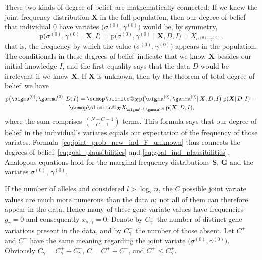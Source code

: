 \documentclass[\ifafour a4paper,12pt,\else a5paper,10pt,\fi%
onecolumn,oneside,article,%
british%
]{memoir}
\makeatletter
\theoremstyle{remark}
\theoremstyle{innote}
\def\sum{\DOTSI\sumop\slimits@}
\renewcommand{\le}{\leqslant}%
\newcommand*{\pf}{\mathrm{p}}%
\renewcommand*{\|}{\mathpunct{|}}
\newcommand*{\dob}{degree of belief}
\newcommand*{\dobs}{degrees of belief}
\newcommand*{\yD}{D}
\newcommand*{\yI}{I}
\newcommand*{\ys}{\sigma}
\newcommand*{\yg}{\gamma}
\newcommand*{\gn}{l}
\newcommand*{\ysi}[1]{\ys^{(#1)}}
\newcommand*{\ygi}[1]{\yg^{(#1)}}
\newcommand*{\yso}{\ysi{0}}
\newcommand*{\ygo}{\ygi{0}}
\newcommand*{\yFs}{\bm{S}}
\newcommand*{\yFg}{\bm{G}}
\newcommand*{\yF}{\bm{X}}
\newcommand*{\yCg}{C_{\gamma}}
\newcommand*{\yCgd}{\yCg^{+}}
\newcommand*{\yCgn}{\yCg^{-}}
\newcommand*{\yCd}{C^{+}}
\newcommand*{\yCn}{C^{-}}
\makeatother
\begin{document}
These two kinds of \dob\ are mathematically connected: If we knew the joint
frequency distribution $\yF$ in the full population, then our degree of
belief that individual $0$ have variates $\bigl( \yso,\ygo \bigr)$ would
be, by symmetry,
\begin{equation}
  \label{eq:joint_prob_new_ind_F_known}
  \pf\bigl(\yso, \ygo \| \yF, \yI\bigr)  =
  \pf\bigl(\yso, \ygo \| \yF, \yD, \yI\bigr)  =
  X_{\yso, \ygo},
\end{equation}
that is, the frequency by which the value $\bigl(\yso, \ygo\bigr)$ appears
in the population. The conditionals in these \dobs\ indicate that we know
$\yF$ besides our initial knowledge $\yI$, and the first equality says that
the data $\yD$ would be irrelevant if we knew $\yF$. If $\yF$ is unknown,
then by the theorem of total \dob\ we have
\begin{multline}
  \label{eq:joint_prob_new_ind_F_unknown}
  \pf\bigl(\yso, \ygo \| \yD, \yI\bigr)  =
  \sum_{\yF}  \pf\bigl(\yso, \ygo \| \yF, \yD, \yI\bigr) \;
  \pf( \yF \| \yD, \yI) \equiv{}\\
  \sum_{\yF}  X_{\yso, \ygo}\,  \pf( \yF \| \yD, \yI),
\end{multline}
where the sum comprises $\binom{N+C-1}{C-1}$ terms. This formula says that
our \dob\ in the individual's variates equals our expectation of the
frequency of those variates.
Formula~\eqref{eq:joint_prob_new_ind_F_unknown} thus connects the degrees
of belief~\eqref{eq:goal_plausibilities} and
\eqref{eq:goal_ind_plausibilities}. Analogous equations hold for the
marginal frequency distributions $\yFs$, $\yFg$ and the variates $\yso$,
$\ygo$.


If the number of alleles and considered $\gn>\log_{2}n$, the $C$ possible
joint variate values are much more numerous than the data $n$; not all of
them can therefore appear in the data. Hence many of these gene variate
values have frequencies $g_{\yg}=0$ and consequently $x_{\ys,\yg}=0$.
Denote by $\yCgd$ the number of distinct gene variations present in the
data, and by $\yCgn$ the number of those absent. Let $\yCd$ and $\yCn$ have
the same meaning regarding the joint variate
$\bigl( \ysi{0}, \ygi{0} \bigr)$. Obviously $\yCg = \yCgd+\yCgn$,
$C=\yCd+\yCn$, and $\yCd \le \yCgd$.
\end{document}
